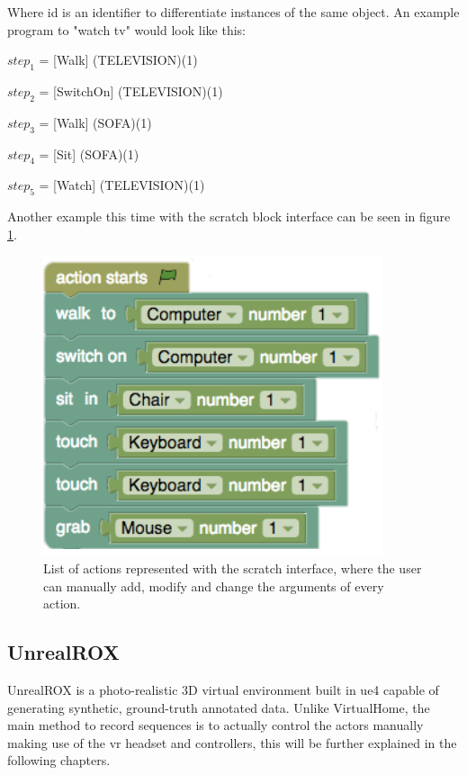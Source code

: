 Where id is an identifier to differentiate instances of the same object. An example program to "watch tv" would look like this: 
\newline

$step_1$ = [Walk] (TELEVISION)(1)

$step_2$ = [SwitchOn] (TELEVISION)(1)

$step_3$ = [Walk] (SOFA)(1)

$step_4$ = [Sit] (SOFA)(1)

$step_5$ = [Watch] (TELEVISION)(1) \newline

Another example this time with the scratch block interface can be seen in figure \ref{fig:virtualhome_example}.

\begin{figure}[h]
	\includegraphics[scale=0.5]{archivos/virtualhome_example.png}
	\centering
	\caption{List of actions represented with the scratch interface, where the user can manually add, modify and change the arguments of every action.}
	\label{fig:virtualhome_example}
\end{figure}

\subsection{UnrealROX}
UnrealROX \cite{DBLP:journals/corr/abs-1810-06936} is a photo-realistic 3D virtual environment built in \gls{ue4} capable of generating synthetic, ground-truth annotated data. Unlike VirtualHome, the main method to record sequences is to actually control the actors manually making use of the \gls{vr} headset and controllers, this will be further explained in the following chapters.

